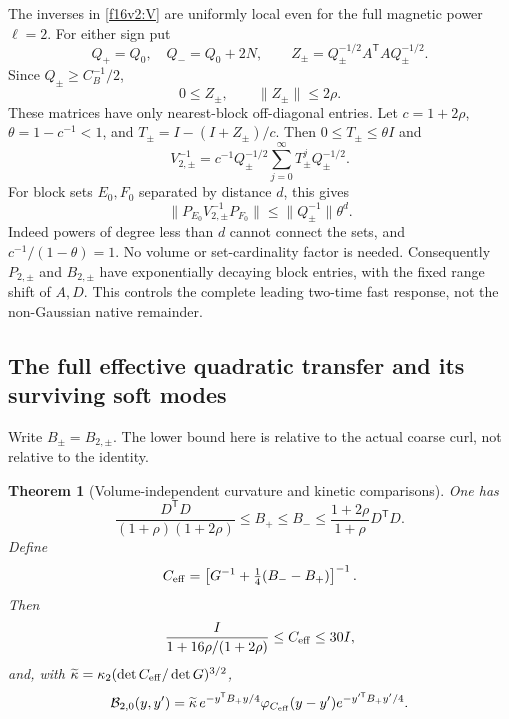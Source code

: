 \documentclass[11pt,oneside]{article}
\newtheorem{theorem}{Theorem}[section]
\begin{document}
The inverses in \eqref{f16v2:V} are uniformly local even for the
full magnetic power \(\ell=2\).
For either sign put
\[
 Q_+=Q_0,\quad Q_-=Q_0+2N,\qquad
 Z_\pm=Q_\pm^{-1/2}A^{\mathsf T}A Q_\pm^{-1/2}.
\]
Since \(Q_\pm\ge C_B^{-1}/2\),
\[
                 0\le Z_\pm,\qquad \|Z_\pm\|\le2\rho .
\]
These matrices have only nearest-block off-diagonal entries.
Let \(c=1+2\rho\), \(\theta=1-c^{-1}<1\), and
\(T_\pm=I-(I+Z_\pm)/c\). Then \(0\le T_\pm\le\theta I\) and
\begin{equation}
 V_{2,\pm}^{-1}
   =c^{-1}Q_\pm^{-1/2}
                     \sum_{j=0}^{\infty}T_\pm^jQ_\pm^{-1/2}.
 \label{f16v2:local-inverse}
\end{equation}
For block sets \(E_0,F_0\) separated by distance \(d\), this gives
\[
 \|P_{E_0}V_{2,\pm}^{-1}P_{F_0}\|
                    \le\|Q_\pm^{-1}\|\theta^d.
\]
Indeed powers of degree less than \(d\) cannot connect the sets,
and \(c^{-1}/(1-\theta)=1\).
No volume or set-cardinality factor is needed.
Consequently \(P_{2,\pm}\) and \(B_{2,\pm}\) have exponentially
decaying block entries, with the fixed range shift of \(A,D\).
This controls the complete leading two-time fast response,
not the non-Gaussian native remainder.

\subsection{The full effective quadratic transfer and its surviving soft modes}

Write \(B_\pm=B_{2,\pm}\).
The lower bound here is relative to the actual coarse curl,
not relative to the identity.

\begin{theorem}[Volume-independent curvature and kinetic comparisons]
\label{f16v2:comparison}
One has
\begin{equation}
 \frac{D^{\mathsf T}D}{(1+\rho)(1+2\rho)}
       \le B_+\le B_-
       \le\frac{1+2\rho}{1+\rho}D^{\mathsf T}D .
 \label{f16v2:Bbounds}
\end{equation}
Define
\[
       C_{\rm eff}
       =\left[G^{-1}+\tfrac14(B_--B_+)\right]^{-1}.
\]
Then
\begin{equation}
 \frac{I}{1+16\rho/(1+2\rho)}
       \le C_{\rm eff}\le30I ,
 \label{f16v2:Ceffbounds}
\end{equation}
and, with
\(\widetilde\kappa=\kappa_2(\det C_{\rm eff}/\det G)^{3/2}\),
\begin{equation}
 \mathcal B_{2,0}(y,y')
   =\widetilde\kappa\,
      e^{-y^{\mathsf T}B_+y/4}
       \varphi_{C_{\rm eff}}(y-y')
      e^{-y'^{\mathsf T}B_+y'/4}.
 \label{f16v2:effective}
\end{equation}
\end{theorem}
\end{document}
